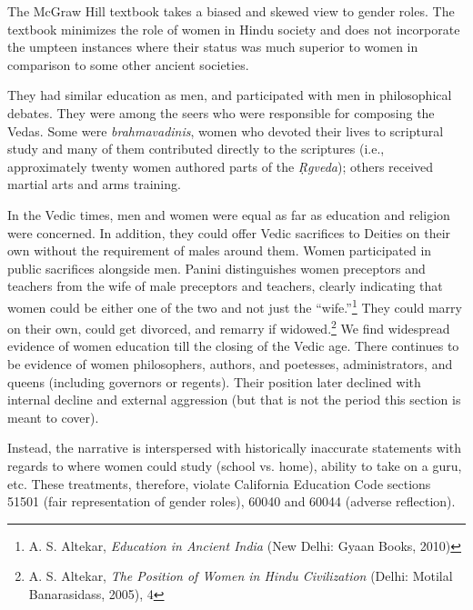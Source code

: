 The McGraw Hill textbook takes a biased and skewed view to gender roles. The textbook minimizes the role of women in Hindu society and does not incorporate the umpteen instances where their status was much superior to women in comparison to some other ancient societies.  

They had similar education as men, and participated with men in philosophical debates. They were among the seers who were responsible for composing the Vedas. Some were \textit{brahmavadinis},  women who devoted their lives to scriptural study and many of them contributed directly to the scriptures (i.e., approximately twenty women authored parts of the \textit{Ṛgveda}); others received martial arts and arms training.

In the Vedic times, men and women were equal as far as education and religion were concerned. In addition, they could offer Vedic sacrifices to Deities on their own without the requirement of males around them. Women participated in public sacrifices alongside men. Panini distinguishes women preceptors and teachers from the wife of male preceptors and teachers, clearly indicating that women could be either one of the two and not just the “wife.”\footnote{A. S. Altekar, \textit{Education in Ancient India} (New Delhi: Gyaan Books, 2010)} They could marry on their own, could get divorced, and remarry if widowed.\footnote{A. S. Altekar, \textit{The Position of Women in Hindu Civilization} (Delhi: Motilal Banarasidass, 2005), 4} We find widespread evidence of women education till the closing of the Vedic age. There continues to be evidence of women philosophers, authors, and poetesses, administrators, and queens (including governors or regents). Their position later declined with internal decline and external aggression (but that is not the period this section is meant to cover).

Instead, the narrative is interspersed with historically inaccurate statements with regards to where women could study (school vs. home), ability to take on a guru, etc. These treatments, therefore, violate California Education Code sections 51501 (fair representation of gender roles), 60040 and 60044 (adverse reflection).  

